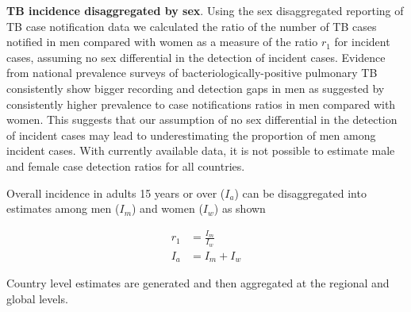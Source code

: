 \textbf{TB incidence disaggregated by sex}. Using the sex disaggregated reporting of TB case notification data we calculated the ratio of the number of TB cases notified in men compared with women as a measure of the ratio $r_1$ for incident cases, assuming no sex differential in the detection of incident cases. Evidence from national prevalence surveys of bacteriologically-positive pulmonary TB consistently show bigger recording and detection gaps in men as suggested by consistently higher prevalence to case notifications ratios in men compared with women\cite{Onozaki_2015}. This suggests that our assumption of no sex differential in the detection of incident cases may lead to underestimating the proportion of men among incident cases. With currently available data, it is not possible to estimate male and female case detection ratios for all countries.    

Overall incidence in adults 15 years or over ($I_a$) can be disaggregated into estimates among men ($I_m$) and women ($I_w$) as shown

\begin{align}
r_1 &= \frac{I_m}{I_w} \\
I_a &= I_m + I_w
\end{align}

Country level estimates are generated and then aggregated at the regional and global levels.



